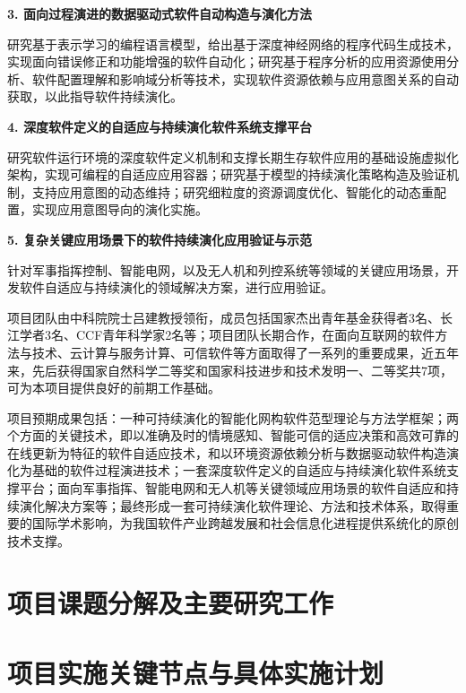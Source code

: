 \documentclass{icsartcn}
\begin{document}
\textbf{3. 面向过程演进的数据驱动式软件自动构造与演化方法}

研究基于表示学习的编程语言模型，给出基于深度神经网络的程序代码生成技术，实现面向错误修正和功能增强的软件自动化；研究基于程序分析的应用资源使用分析、软件配置理解和影响域分析等技术，实现软件资源依赖与应用意图关系的自动获取，以此指导软件持续演化。

\textbf{4. 深度软件定义的自适应与持续演化软件系统支撑平台}

研究软件运行环境的深度软件定义机制和支撑长期生存软件应用的基础设施虚拟化架构，实现可编程的自适应应用容器；研究基于模型的持续演化策略构造及验证机制，支持应用意图的动态维持；研究细粒度的资源调度优化、智能化的动态重配置，实现应用意图导向的演化实施。

\textbf{5. 复杂关键应用场景下的软件持续演化应用验证与示范}

针对军事指挥控制、智能电网，以及无人机和列控系统等领域的关键应用场景，开发软件自适应与持续演化的领域解决方案，进行应用验证。

项目团队由中科院院士吕建教授领衔，成员包括国家杰出青年基金获得者3名、长江学者3名、CCF青年科学家2名等；项目团队长期合作，在面向互联网的软件方法与技术、云计算与服务计算、可信软件等方面取得了一系列的重要成果，近五年来，先后获得国家自然科学二等奖和国家科技进步和技术发明一、二等奖共7项，可为本项目提供良好的前期工作基础。

项目预期成果包括：一种可持续演化的智能化网构软件范型理论与方法学框架；两个方面的关键技术，即以准确及时的情境感知、智能可信的适应决策和高效可靠的在线更新为特征的软件自适应技术，和以环境资源依赖分析与数据驱动软件构造演化为基础的软件过程演进技术；一套深度软件定义的自适应与持续演化软件系统支撑平台；面向军事指挥、智能电网和无人机等关键领域应用场景的软件自适应和持续演化解决方案等；最终形成一套可持续演化软件理论、方法和技术体系，取得重要的国际学术影响，为我国软件产业跨越发展和社会信息化进程提供系统化的原创技术支撑。



\section{项目课题分解及主要研究工作}

\section{项目实施关键节点与具体实施计划}
\end{document}
